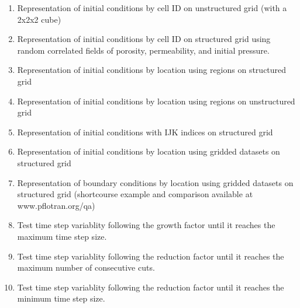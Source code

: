 \begin{enumerate}[label=Test \greek*.,ref=Test \greek*,nosep]
\item \label{testRepICCellIDUnstruc} Representation of initial conditions by cell ID on unstructured grid (with a 2x2x2 cube)
\item \label{testRepICCellIDStruc16} Representation of initial conditions by cell ID on structured grid using random correlated fields of porosity, permeability, and initial pressure.
\item \label{testRepICRegStruc} Representation of initial conditions by location using regions on structured grid
\item \label{testRepICRegUnstruc} Representation of initial conditions by location using regions on unstructured grid
\item \label{testRepICIJKStruc} Representation of initial conditions with IJK indices on structured grid
\item \label{testRepICGridStruc} Representation of initial conditions by location using gridded datasets on structured grid
\item \label{testRepBCGridStruc} Representation of boundary conditions by location using gridded datasets on structured grid (shortcourse example  and comparison available at www.pflotran.org/qa)
\item \label{testTimeStepGrowth} Test time step variablity following the growth factor until it reaches the maximum time step size.
\item \label{testTimeStepReductCut} Test time step variablity following the reduction factor until it reaches the maximum number of consecutive cuts.
\item \label{testTimeStepReduct} Test time step variablity following the reduction factor until it reaches the minimum time step size.
\end{enumerate}

